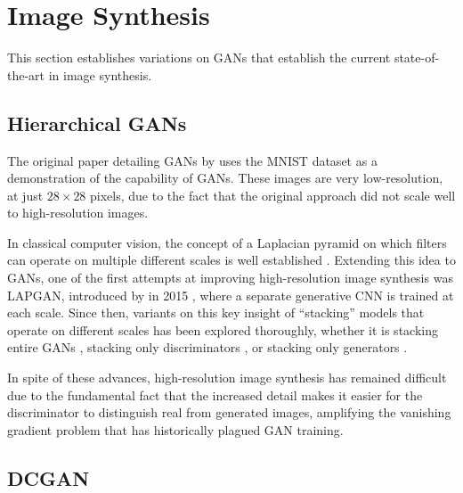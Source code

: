 \section{Image Synthesis}

This section establishes variations on GANs that establish the current state-of-the-art in image synthesis.

\subsection{Hierarchical GANs} \label{sec:hierarchgan}

The original paper detailing GANs by \citeauthor{gan} uses the MNIST dataset as a demonstration of the capability of GANs.
These images are very low-resolution, at just $28\times 28$ pixels, due to the fact that the original approach did not scale well to high-resolution images.

In classical computer vision, the concept of a Laplacian pyramid on which filters can operate on multiple different scales is well established \cite{1095851}. Extending this idea to GANs, one of the first attempts at improving high-resolution image synthesis was LAPGAN, introduced by \citeauthor{DBLP:journals/corr/DentonCSF15} in 2015 \cite{DBLP:journals/corr/DentonCSF15}, where a separate generative CNN is trained at each scale. 
Since then, variants on this key insight of ``stacking'' models that operate on different scales has been explored thoroughly, whether it is stacking entire GANs \cite{DBLP:journals/corr/HuangLPHB16}, stacking only discriminators \cite{TCWang2017}, or stacking only generators \cite{DBLP:journals/corr/GhoshKNTD17}. 

In spite of these advances, high-resolution image synthesis has remained difficult due to the fundamental fact that the increased detail makes it easier for the discriminator to distinguish real from generated images, amplifying the vanishing gradient problem that has historically plagued GAN training. 

\subsection{DCGAN}

